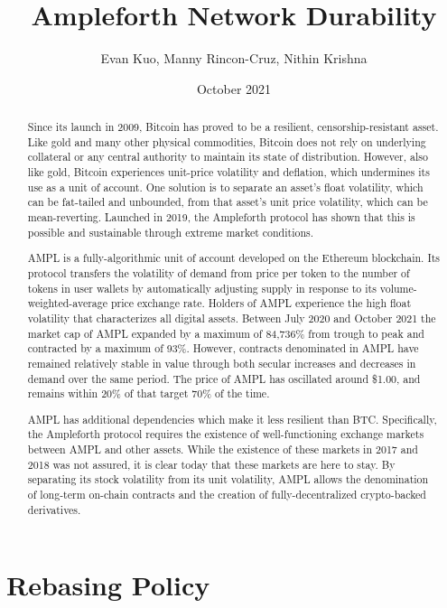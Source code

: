 \documentclass[11pt]{article}
\title{Ampleforth Network Durability}
\author{Evan Kuo, Manny Rincon-Cruz, Nithin Krishna}
\date{October 2021}
\begin{document}
\maketitle

\begin{abstract}
Since its launch in 2009, Bitcoin has proved to be a resilient, censorship-resistant asset.
Like gold and many other physical commodities, Bitcoin does not rely on underlying collateral
or any central authority to maintain its state of distribution. However, also like gold, Bitcoin
experiences unit-price volatility and deflation, which undermines its use as a unit of account.
One solution is to separate an asset's float volatility, which can be fat-tailed and unbounded,
from that asset's unit price volatility, which can be mean-reverting. Launched in 2019, the
Ampleforth protocol has shown that this is possible and sustainable through extreme market
conditions.

\bigskip
AMPL is a fully-algorithmic unit of account developed on the Ethereum blockchain. Its
protocol transfers the volatility of demand from price per token to the number of tokens in
user wallets by automatically adjusting supply in response to its volume-weighted-average
price exchange rate. Holders of AMPL experience the high float volatility that characterizes
all digital assets. Between July 2020 and October 2021 the market cap of AMPL expanded by
a maximum of 84,736\% from trough to peak and contracted by a maximum of 93\%. However,
contracts denominated in AMPL have remained relatively stable in value through both secular
increases and decreases in demand over the same period. The price of AMPL has oscillated
around \$1.00, and remains within 20\% of that target 70\% of the time.

\bigskip
AMPL has additional dependencies which make it less resilient than BTC. Specifically, the
Ampleforth protocol requires the existence of well-functioning exchange markets between AMPL
and other assets. While the existence of these markets in 2017 and 2018 was not assured, it is
clear today that these markets are here to stay. By separating its stock volatility from its unit
volatility, AMPL allows the denomination of long-term on-chain contracts and the creation of
fully-decentralized crypto-backed derivatives.
\end{abstract}

\section{Rebasing Policy}
\end{document}
